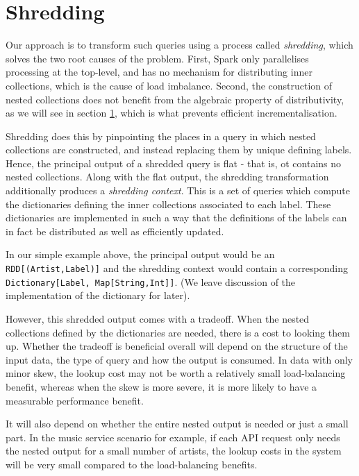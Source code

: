 \section{Shredding} {

Our approach is to transform such queries using a process called \textit{shredding}, which solves the two root causes of the problem. First, Spark only parallelises processing at the top-level, and has no mechanism for distributing inner collections, which is the cause of load imbalance.  Second, the construction of nested collections does not benefit from the algebraic property of distributivity, as we will see in section \ref{}, which is what prevents efficient incrementalisation.

Shredding does this by pinpointing the places in a query in which nested collections are constructed, and instead replacing them by unique defining labels. Hence, the principal output of a shredded query is flat - that is, ot contains no nested collections. Along with the flat output, the shredding transformation additionally produces a \textit{shredding context}. This is a set of queries which compute the dictionaries defining the inner collections associated to each label. These dictionaries are implemented in such a way that the definitions of the labels can in fact be distributed as well as efficiently updated.

In our simple example above, the principal output would be an \lstinline{RDD[(Artist,Label)]} and the shredding context would contain a corresponding \lstinline{Dictionary[Label, Map[String,Int]]}. (We leave discussion of the implementation of the dictionary for later).

However, this shredded output comes with a tradeoff. When the nested collections defined by the dictionaries are needed, there is a cost to looking them up. Whether the tradeoff is beneficial overall will depend on the structure of the input data, the type of query and how the output is consumed. In data with only minor skew, the lookup cost may not be worth a relatively small load-balancing benefit, whereas when the skew is more severe, it is more likely to have a measurable performance benefit.

It will also depend on whether the entire nested output is needed or just a small part. In the music service scenario for example, if each API request only needs the nested output for a small number of artists, the lookup costs in the system will be very small compared to the load-balancing benefits.

}

